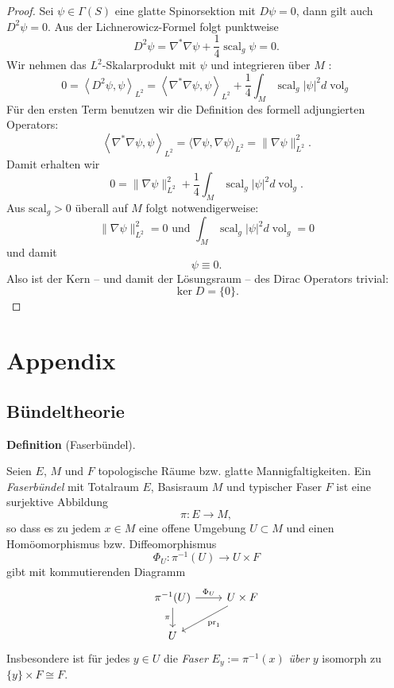 \documentclass[10pt, letterpaper]{article}
\newcommand{\CustomHeading}[3]{%
  \par\medskip\noindent%
  \textbf{#1 #2} \textnormal{(#3)}.\enskip%
}
\newenvironment{DEF}[2]{\CustomHeading{Definition}{#1}{#2}}{}
\begin{document}
\begin{proof}
Sei $\psi \in \Gamma(S)$ eine glatte Spinorsektion mit $D \psi=0$, dann gilt auch $D^2\psi=0$. Aus der Lichnerowicz-Formel folgt punktweise
$$
D^2 \psi=\nabla^* \nabla \psi+\frac{1}{4} \operatorname{scal}_g \psi =0.
$$
Wir nehmen das $L^2$-Skalarprodukt mit $\psi$ und integrieren über $M$ :
$$
0=\left\langle D^2 \psi, \psi\right\rangle_{L^2}=\left\langle\nabla^* \nabla \psi, \psi\right\rangle_{L^2}+\frac{1}{4} \int_M \operatorname{scal}_g|\psi|^2 d \operatorname{vol}_g
$$
Für den ersten Term benutzen wir die Definition des formell adjungierten Operators:
$$
\left\langle\nabla^* \nabla \psi, \psi\right\rangle_{L^2}=\langle\nabla \psi, \nabla \psi\rangle_{L^2}=\|\nabla \psi\|_{L^2}^2 .
$$
Damit erhalten wir
$$
0=\|\nabla \psi\|_{L^2}^2+\frac{1}{4} \int_M \operatorname{scal}_g|\psi|^2 d \operatorname{vol}_g .
$$
Aus $\text {scal}_g>0$ überall auf $M$ folgt notwendigerweise:
$$
\|\nabla \psi\|_{L^2}^2=0 \text { und } \int_M \operatorname{scal}_g|\psi|^2 d \operatorname{vol}_g=0
$$
und damit
$$
\psi \equiv 0 .
$$
Also ist der Kern – und damit der Lösungsraum – des Dirac Operators trivial:
\[
\ker D=\{0\}.
\]
\end{proof}

\pagebreak


\section{Appendix}



\subsection{Bündeltheorie}

\begin{DEF}{}{Faserbündel}
Seien $E$, $M$ und $F$ topologische Räume bzw. glatte Mannigfaltigkeiten. Ein \emph{Faserbündel} mit Totalraum $E$, Basisraum $M$ und typischer Faser $F$
ist eine surjektive Abbildung
\[
\pi:E\to M,
\]
so dass es zu jedem $x\in M$ eine offene Umgebung $U\subset M$ und einen
Homöomorphismus bzw. Diffeomorphismus
\[
\Phi_U:\pi^{-1}(U)\to U\times F
\]
gibt mit kommutierenden Diagramm
\[
\begin{tikzcd}
\pi^{-1}(U) \arrow[r,"\Phi_U"] \arrow[d,"\pi"'] & U\times F \arrow[dl,"\operatorname{pr}_1"] \\
U &
\end{tikzcd}
\]
Insbesondere ist für jedes $y\in U$ die \emph{Faser} $E_y:=\pi^{-1}(x)$ \emph{über} $y$ isomorph zu $\{y\}\times F\cong F$.
\end{DEF}
\end{document}
